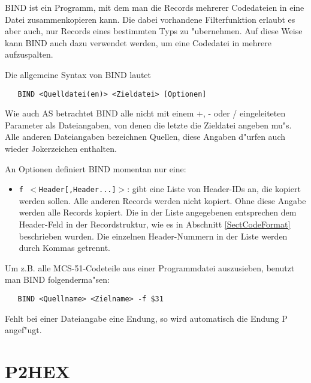\documentclass[12pt,a4paper,twoside]{report}
\newcommand{\tty}[1]{{\tt #1}}
\begin{document}
BIND ist ein Programm, mit dem man die Records mehrerer Codedateien
in eine Datei zusammenkopieren kann.  Die dabei vorhandene Filterfunktion
erlaubt es aber auch, nur Records eines bestimmten Typs zu "ubernehmen.
Auf diese Weise kann BIND auch dazu verwendet werden, um eine Codedatei
in mehrere aufzuspalten.
\par
Die allgemeine Syntax von BIND lautet
\begin{verbatim}
   BIND <Quelldatei(en)> <Zieldatei> [Optionen]
\end{verbatim}
Wie auch AS betrachtet BIND alle nicht mit einem +, - oder / eingeleiteten
Parameter als Dateiangaben, von denen die letzte die Zieldatei angeben
mu"s.  Alle anderen Dateiangaben bezeichnen Quellen, diese Angaben d"urfen
auch wieder Jokerzeichen enthalten.
\par
An Optionen definiert BIND momentan nur eine:
\begin{itemize}
\item{\tty{f $<$Header[,Header...]$>$}: gibt eine Liste von Header-IDs
      an, die kopiert werden sollen.  Alle anderen Records werden
      nicht kopiert.  Ohne diese Angabe werden alle Records kopiert.
      Die in der Liste angegebenen entsprechen dem Header-Feld in der
      Recordstruktur, wie es in Abschnitt \ref{SectCodeFormat} beschrieben wurden. Die
      einzelnen Header-Nummern in der Liste werden durch Kommas getrennt.}
\end{itemize}
Um z.B. alle MCS-51-Codeteile aus einer Programmdatei auszusieben,
benutzt man BIND folgenderma"sen:
\begin{verbatim}
   BIND <Quellname> <Zielname> -f $31
\end{verbatim}
Fehlt bei einer Dateiangabe eine Endung, so wird automatisch die Endung
P angef"ugt.


\section{P2HEX}
\end{document}
